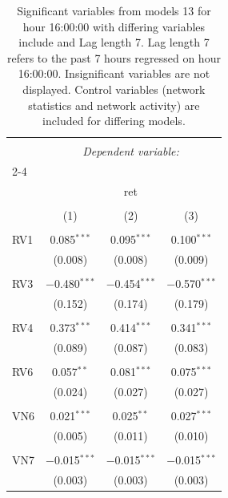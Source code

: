
\begin{table}[!htbp] \centering 
  \caption{Significant variables from models 13 for hour 16:00:00 with differing variables include 
                               and Lag length 7. Lag length 7 refers to the past 7 hours regressed on hour 16:00:00. 
                               Insignificant variables are not displayed. 
                               Control variables (network statistics and network activity) are 
                               included for differing models.} 
  \label{RVmodels2_t_hourlagged3} 
\scriptsize 
\begin{tabular}{@{\extracolsep{5pt}}lccc} 
\\[-1.8ex]\hline 
\hline \\[-1.8ex] 
 & \multicolumn{3}{c}{\textit{Dependent variable:}} \\ 
\cline{2-4} 
\\[-1.8ex] & \multicolumn{3}{c}{ret} \\ 
\\[-1.8ex] & (1) & (2) & (3)\\ 
\hline \\[-1.8ex] 
 RV1 & 0.085$^{***}$ & 0.095$^{***}$ & 0.100$^{***}$ \\ 
  & (0.008) & (0.008) & (0.009) \\ 
  & & & \\ 
 RV3 & $-$0.480$^{***}$ & $-$0.454$^{***}$ & $-$0.570$^{***}$ \\ 
  & (0.152) & (0.174) & (0.179) \\ 
  & & & \\ 
 RV4 & 0.373$^{***}$ & 0.414$^{***}$ & 0.341$^{***}$ \\ 
  & (0.089) & (0.087) & (0.083) \\ 
  & & & \\ 
 RV6 & 0.057$^{**}$ & 0.081$^{***}$ & 0.075$^{***}$ \\ 
  & (0.024) & (0.027) & (0.027) \\ 
  & & & \\ 
 VN6 & 0.021$^{***}$ & 0.025$^{**}$ & 0.027$^{***}$ \\ 
  & (0.005) & (0.011) & (0.010) \\ 
  & & & \\ 
 VN7 & $-$0.015$^{***}$ & $-$0.015$^{***}$ & $-$0.015$^{***}$ \\ 
  & (0.003) & (0.003) & (0.003) \\ 

\end{tabular}
\end{table}
